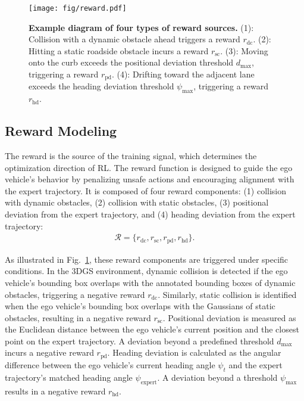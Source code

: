 \begin{figure}[t]
\centering
\texttt{[image: fig/reward.pdf]} 
\caption{\textbf{Example diagram of four types of reward sources.}  (1): Collision with a dynamic obstacle ahead triggers a reward $r_{\text{dc}}$. (2): Hitting a static roadside obstacle incurs a reward $r_{\text{sc}}$. (3): Moving onto the curb exceeds the positional deviation threshold $d_{\text{max}}$, triggering a reward $r_{\text{pd}}$. (4): Drifting toward the adjacent lane exceeds the heading deviation threshold $\psi_{\text{max}}$, triggering a reward $r_{\text{hd}}$.
}
\label{fig: reward source}
\end{figure}
\subsection{Reward Modeling}
\label{sec:reward}
The reward is the source of the training signal, which determines the optimization direction of RL. The reward function is designed to guide the ego vehicle's behavior by penalizing unsafe actions and encouraging alignment with the expert trajectory. It is composed of four reward components: (1) collision with dynamic obstacles, (2) collision with static obstacles, (3) positional deviation from the expert trajectory, and (4) heading deviation from the expert trajectory:
\begin{equation}
\begin{aligned}
\mathcal{R} = \{r_{\text{dc}}, r_{\text{sc}}, r_{\text{pd}}, r_{\text{hd}}  \}. 
\end{aligned}
\end{equation}

As illustrated in Fig.~\ref{fig: reward source}, these reward components are triggered under specific conditions.  
In the 3DGS environment, dynamic collision is detected if the ego vehicle's bounding box overlaps with the annotated bounding boxes of dynamic obstacles, triggering a negative reward $r_{\text{dc}}$. Similarly, static collision is identified when the ego vehicle's bounding box overlaps with the Gaussians of static obstacles, resulting in a negative reward $r_{\text{sc}}$.  
Positional deviation is measured as the Euclidean distance between the ego vehicle's current position and the closest point on the expert trajectory. A deviation beyond a predefined threshold $d_{\text{max}}$ incurs a negative reward $r_{\text{pd}}$.  
Heading deviation is calculated as the angular difference between the ego vehicle's current heading angle $ \psi_t $ and the expert trajectory's matched heading angle $\psi_{\text{expert}}$. A deviation beyond a threshold $ \psi_{\text{max}}$ results in a negative reward $r_{\text{hd}}$.


